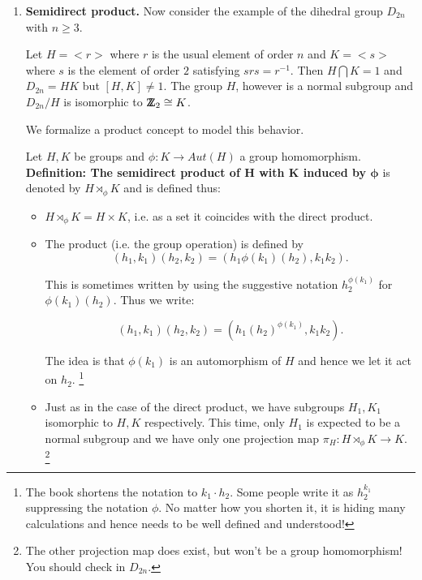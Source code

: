 \documentclass[12pt]{article}
\newcommand{\deff}[1]{{\bf Definition: #1} }
\def\DZ{ \mbox{\rm Z \kern -0.75em Z} }
\begin{document}
\begin{enumerate}
{\bf Example.} Let $G=\DZ_{15}$ and $H_1=<[3]_{15}>$ and
$K_1=<[5]_{15}>$.
Check that $G$ is an internal direct product of $H_1,K_1$.
\footnote{Remember that we need to use the additive notation here.}

Note, in turn, that $H_1\cong \DZ_{5}$ and $K_1\cong \DZ_{3}$ and this
is simply the reaffirmation that $\DZ_{15}\cong \DZ_{5}\times \DZ_{3}$.

\item {\bf Semidirect product.}
Now consider the example of the dihedral group $D_{2n}$ with $n\geq 3$.

Let $H=<r>$ where $r$ is the usual element of order $n$ and $K=<s>$
where $s$ is the element of order $2$ satisfying $srs=r^{-1}$.
Then $H\bigcap K = 1$ and $D_{2n}=HK$ but $[H,K]\neq 1$.
The group $H$, however is a normal subgroup and $D_{2n}/H$ is isomorphic
to $\DZ_2 \cong K$.

We formalize a product concept to model this behavior.

Let $H,K$ be groups and $\phi:K\rightarrow Aut(H)$ a group
homomorphism. 
\deff{The semidirect product of $\mathbf{H}$ with $\mathbf{K}$
 induced
by $\mathbf{\phi}$ } is denoted by $H\rtimes_\phi K$ and is defined thus:
\begin{itemize}
\item $H\rtimes_\phi K = H \times K$, i.e. as a set it coincides with
the direct product.
\item The product (i.e. the group operation)  is defined by 
$$(h_1,k_1)(h_2,k_2)=(h_1\phi(k_1)(h_2),k_1k_2).$$

This is sometimes written by using the suggestive notation 
$h_2^{\phi(k_1)}$ for $\phi(k_1)(h_2)$. Thus we write:

$$(h_1,k_1)(h_2,k_2)=(h_1(h_2)^{\phi(k_1)},k_1k_2).$$

The idea is that $\phi(k_1)$ is an
automorphism of $H$ and hence we let it act on $h_2$.
\footnote{The book shortens the notation to $k_1\cdot h_2$. Some people
write it as $h_2^{k_1}$ suppressing the notation $\phi$. No matter how
you shorten it, it is hiding many calculations and hence needs to be
well defined and understood!}

\item Just as in the case of the direct product, we have subgroups
$H_1,K_1$ isomorphic to $H,K$ respectively. This time, only $H_1$ is 
expected to be a normal subgroup and we have only one projection map  
$\pi_H:H\rtimes_\phi K \rightarrow K$.
\footnote{The other projection map does exist, but won't be a group
homomorphism! You should check in $D_{2n}$.}


\end{itemize}
\end{enumerate}
\end{document}
